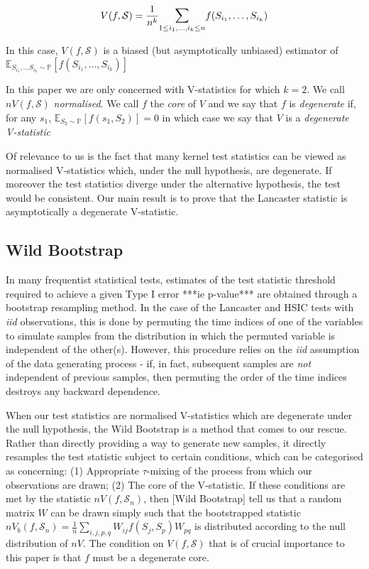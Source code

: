 \documentclass{article}
\begin{document}
\[ V(f,\mathcal{S}) =  \frac{1}{n^k} \mathlarger{\sum}_{1\leq i_1,\ldots, i_k \leq n} f(S_{i_1},\ldots,S_{i_k})\]

In this case, $V(f,\mathcal{S})$ is a biased (but asymptotically unbiased) estimator of $\mathbb{E}_{S_{i_1},\ldots S_{i_k} \sim \mathbb{P}}[f(S_{i_1},\ldots,S_{i_k})]$

In this paper we are only concerned with V-statistics for which $k=2$. We call $nV(f,\mathcal{S})$ \emph{normalised}. We call $f$ the \emph{core} of $V$ and we say that $f$ is \emph{degenerate} if, for any $s_1$, $\mathbb{E}_{S_2 \sim \mathbb{P}}[f(s_1,S_2)] = 0$ in which case we say that $V$ is a \emph{degenerate V-statistic} 

Of relevance to us is the fact that many kernel test statistics can be viewed as normalised V-statistics which, under the null hypothesis, are degenerate. If moreover the test statistics diverge under the alternative hypothesis, the test would be consistent. Our main result is to prove that the Lancaster statistic is asymptotically a degenerate V-statistic.

\subsection{Wild Bootstrap}

In many frequentist statistical tests, estimates of the test statistic threshold required to achieve a given Type I error ***ie p-value*** are obtained through a bootstrap resampling method. In the case of the Lancaster and HSIC tests with \emph{iid} observations, this is done by permuting the time indices of one of the variables to simulate samples from the distribution in which the permuted variable is independent of the other(s). However, this procedure relies on the \emph{iid} assumption of the data generating process - if, in fact, subsequent samples are \emph{not} independent of previous samples, then permuting the order of the time indices destroys any backward dependence. 

When our test statistics are normalised V-statistics which are degenerate under the null hypothesis, the Wild Bootstrap is a method that comes to our rescue. Rather than directly providing a way to generate new samples, it directly resamples the test statistic subject to certain conditions, which can be categorised as concerning: (1) Appropriate $\tau$-mixing of the process from which our observations are drawn; (2) The core of the V-statistic. If these conditions are met by the statistic $nV(f,\mathcal{S}_n)$, then [Wild Bootstrap] tell us that a random matrix $W$ can be drawn simply such that the bootstrapped statistic $nV_b(f,\mathcal{S}_n)=\frac{1}{n}\sum_{i,j,p,q}W_{ij}f(S_j,S_p)W_{pq}$ is distributed according to the null distribution of $nV$. The condition on $V(f,\mathcal{S})$ that is of crucial importance to this paper is that $f$ must be a degenerate core.
\end{document}
